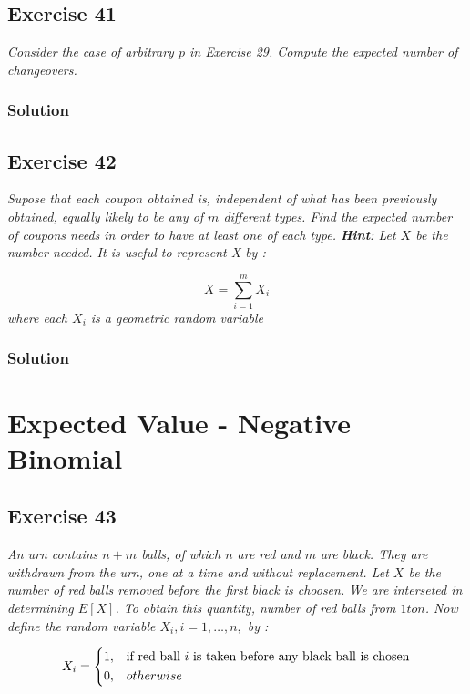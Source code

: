 \documentclass[12pt,a4paper]{article}
\begin{document}
\subsection{Exercise 41}
\textit{Consider the case of arbitrary $p$ in Exercise 29. Compute the expected number of changeovers.}

\subsubsection{Solution}

\subsection{Exercise 42}
\textit{Supose that each coupon obtained is, independent of what has been previously obtained, equally likely to be any of $m$ different types. Find the expected number of coupons needs in order to have at least one of each type. \textbf{Hint}: Let $X$ be the number needed. It is useful to represent X by :}

\[
    X = \sum^m_{i=1} X_i
\]
\textit{where each $X_i$ is a geometric random variable}

\subsubsection{Solution}

\section{Expected Value - Negative Binomial}
\subsection{Exercise 43}
\textit{An urn contains $n+m$ balls, of which $n$ are red and $m$ are black. They are withdrawn from the urn, one at a time and without replacement. Let $X$ be the number of red balls removed before the first black is choosen. We are interseted in determining $E[X]$. To obtain this quantity, number of red balls from $1 to n$. Now define the random variable $X_i, i=1, \dots, n,$ by : }

\[X_i = 
\begin{dcases}
    1, & \text{if red ball $i$ is taken before any black ball is chosen} \\
    0, & otherwise
\end{dcases}

\]
\end{document}
